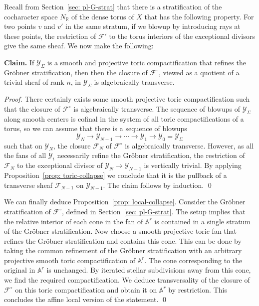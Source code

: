 \documentclass[11pt]{amsart}
\theoremstyle{definition}
\theoremstyle{definition}
\newcommand{\RR}{\mathbb{R}}
\newcommand{\cY}{\mathcal{Y}}
\newcommand{\cal}{\mathcal}
\def\cY{{\cal Y}}
\begin{document}
Recall from Section~\ref{sec: pl-G-strat} that there is a stratification of the cocharacter space $N_\RR$ of the dense torus of $X$ that has the following property. For two points $v$ and $v'$ in the same stratum, if we blowup by introducing rays at these points, the restriction of $\mathcal F'$ to the torus interiors of the exceptional divisors give the same sheaf. We now make the following:

\noindent
{\bf Claim.} If $\mathcal Y_\Sigma$ is a smooth and projective toric compactification that refines the Gr\"obner stratification, then then the closure of $\mathcal F^\circ$, viewed as a quotient of a trivial sheaf of rank $n$, in $\mathcal Y_\Sigma$ is algebraically transverse. 

{\it Proof.} There certainly exists some smooth projective toric compactification such that the closure of $\mathcal F^\circ$ is algebraically transverse. The sequence of blowups of $\mathcal Y_\Sigma$ along smooth centers is cofinal in the system of all toric compactifications of a torus, so we can assume that there is a sequence of blowups
\[
\cY_N\to\cY_{N-1}\to\cdots\to \cY_1\to\cY_0 = \cY_\Sigma
\]
such that on $\cY_N$, the closure $\mathcal F_{N}$ of $\mathcal F^\circ$ is algebraically transverse. However, as all the fans of all $\cY_i$ necessarily refine the Gr\"obner stratification, the restriction of $\mathcal F_N$ to the exceptional divisor of $\cY_N\to\cY_{N-1}$ is vertically trivial. By applying Proposition~\ref{prop: toric-collapse} we conclude that it is the pullback of a transverse sheaf $\mathcal F_{N-1}$ on $\cY_{N-1}$. The claim follows by induction. \qed

We can finally deduce Proposition~\ref{prop: local-collapse}. Consider the Gr\"obner stratification of $\mathcal F^\circ$, defined in Section~\ref{sec: pl-G-strat}. The setup implies that the relative interior of each cone in the fan of $\mathbb A^r$ is contained in a single stratum of the Gr\"obner stratification. Now choose a smooth projective toric fan that refines the Gr\"obner stratification and contains this cone. This can be done by taking the common refinement of the Gr\"obner stratification with an arbitrary projective smooth toric compactification of $\mathbb A^r$. The cone corresponding to the original in $\mathbb A^r$ is unchanged. By iterated stellar subdivisions away from this cone, we find the required compactification. We deduce transversality of the closure of $\mathcal F^\circ$ on this toric compactification and obtain it on $\mathbb A^r$ by restriction. This concludes the affine local version of the statement. \qed
\end{document}
